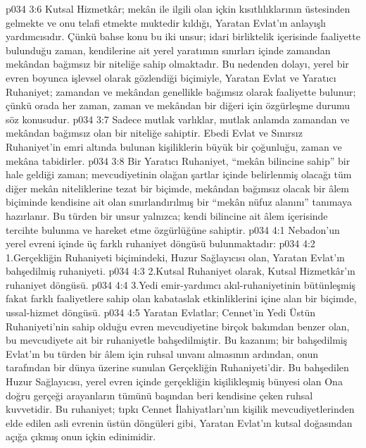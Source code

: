 \vs p034 3:6 Kutsal Hizmetkâr; mekân ile ilgili olan içkin kısıtlılıklarının üstesinden gelmekte ve onu telafi etmekte muktedir kıldığı, Yaratan Evlat’ın anlayışlı yardımcısıdır. Çünkü bahse konu bu iki unsur; idari birliktelik içerisinde faaliyette bulunduğu zaman, kendilerine ait yerel yaratımın sınırları içinde zamandan  mekândan bağımsız bir niteliğe sahip olmaktadır. Bu nedenden dolayı, yerel bir evren boyunca işlevsel olarak gözlendiği biçimiyle, Yaratan Evlat ve Yaratıcı Ruhaniyet; zamandan ve mekândan genellikle bağımsız olarak faaliyette bulunur; çünkü orada her zaman, zaman ve mekândan bir diğeri için özgürleşme durumu söz konusudur.
\vs p034 3:7 Sadece mutlak varlıklar, mutlak anlamda zamandan ve mekândan bağımsız olan bir niteliğe sahiptir. Ebedi Evlat ve Sınırsız Ruhaniyet’in emri altında bulunan kişiliklerin büyük bir çoğunluğu, zaman ve mekâna tabidirler.
\vs p034 3:8 Bir Yaratıcı Ruhaniyet, “mekân bilincine sahip” bir hale geldiği zaman; mevcudiyetinin olağan şartlar içinde belirlenmiş olacağı tüm diğer mekân niteliklerine tezat bir biçimde, mekândan bağımsız olacak bir âlem biçiminde kendisine ait olan sınırlandırılmış bir “mekân nüfuz alanını” tanımaya hazırlanır. Bu türden bir unsur yalnızca; kendi bilincine ait âlem içerisinde tercihte bulunma ve hareket etme özgürlüğüne sahiptir.
\vs p034 4:1 Nebadon’un yerel evreni içinde üç farklı ruhaniyet döngüsü bulunmaktadır:
\vs p034 4:2 1.\bibnobreakspace Gerçekliğin Ruhaniyeti biçimindeki, Huzur Sağlayıcısı olan, Yaratan Evlat’ın bahşedilmiş ruhaniyeti.
\vs p034 4:3 2.\bibnobreakspace Kutsal Ruhaniyet olarak, Kutsal Hizmetkâr’ın ruhaniyet döngüsü.
\vs p034 4:4 3.\bibnobreakspace Yedi emir\hyp{}yardımcı akıl\hyp{}ruhaniyetinin bütünleşmiş fakat farklı faaliyetlere sahip olan kabataslak etkinliklerini içine alan bir biçimde, ussal\hyp{}hizmet döngüsü.
\vs p034 4:5 Yaratan Evlatlar; Cennet’in Yedi Üstün Ruhaniyeti’nin sahip olduğu evren mevcudiyetine birçok bakımdan benzer olan, bu mevcudiyete ait bir ruhaniyetle bahşedilmiştir. Bu kazanım; bir bahşedilmiş Evlat’ın bu türden bir âlem için ruhsal unvanı almasının ardından, onun tarafından bir dünya üzerine sunulan Gerçekliğin Ruhaniyeti’dir. Bu bahşedilen Huzur Sağlayıcısı, yerel evren içinde gerçekliğin kişilikleşmiş bünyesi olan Ona doğru gerçeği arayanların tümünü başından beri kendisine çeken ruhsal kuvvetidir. Bu ruhaniyet; tıpkı Cennet İlahiyatları’nın kişilik mevcudiyetlerinden elde edilen asli evrenin üstün döngüleri gibi, Yaratan Evlat’ın kutsal doğasından açığa çıkmış onun içkin edinimidir.
